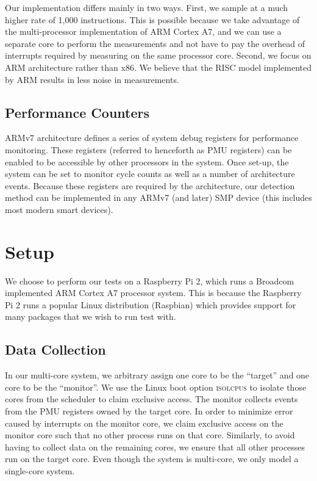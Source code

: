 \documentclass[letterpaper,twocolumn,10pt]{article}
\begin{document}
Our implementation differs mainly in two ways. First, we sample at a much higher rate of 1,000 
instructions. This is possible because we take advantage of the multi-processor 
implementation of ARM Cortex A7, and we can use a separate core to perform the measurements 
and not have to pay the overhead of interrupts required by measuring on the same processor core. 
Second, we focus on ARM architecture rather than x86. We believe that the RISC model 
implemented by ARM results in less noise in measurements.

\subsection*{Performance Counters}

ARMv7 architecture defines a series of system debug registers for performance monitoring\cite{ARMv7}. 
These registers (referred to henceforth as PMU registers) can be enabled to be accessible by other processors in the system. Once set-up, 
the system can be set to monitor cycle counts as well as a number of architecture events. Because these registers 
are required by the architecture, our detection method can be implemented in any ARMv7 (and 
later) SMP device (this includes most modern smart devices).

\section{Setup}

We choose to perform our tests on a Raspberry Pi 2, which runs a Broadcom implemented ARM Cortex A7 processor 
system\cite{RPI}. This is because the Raspberry Pi 2 runs a popular Linux distribution (Raspbian) which 
provides support for many packages that we wish to run test with.

\subsection*{Data Collection}

In our multi-core system, we arbitrary assign one core to be the ``target'' and one core to be the ``monitor''. 
We use the Linux boot option \textsc{isolcpus} to isolate those cores from the scheduler to claim 
exclusive access. The monitor collects events from the PMU registers owned by the target core. In order 
to minimize error caused by interrupts on the monitor core, we claim exclusive access on the monitor core 
such that no other process runs on that core. Similarly, to avoid having to collect data on the remaining 
cores, we ensure that all other processes run on the target core. Even though the system is multi-core, we 
only model a single-core system.
\end{document}
